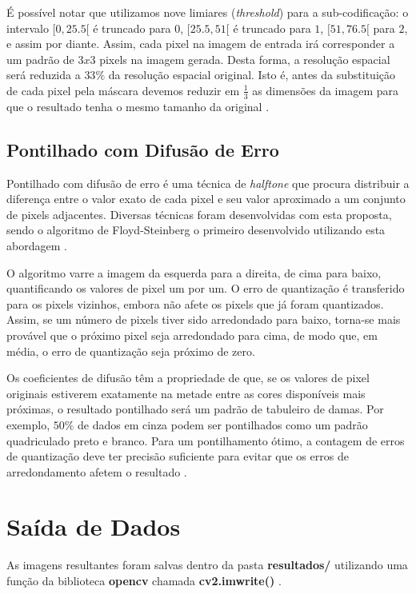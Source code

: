 \documentclass[twoside,twocolumn]{article}
\begin{document}
É possível notar que utilizamos nove limiares (\textit{threshold}) para a sub-codificação: o intervalo $[0,25.5[$ é truncado para $0$, $[25.5,51[$ é truncado para $1$, $[51,76.5[$ para $2$, e assim por diante. Assim, cada pixel na imagem de entrada irá corresponder a um padrão de $3x3$ pixels na imagem gerada. Desta forma, a resolução espacial será reduzida a $33\%$ da resolução espacial original. Isto é, antes da substituição de cada pixel pela máscara devemos reduzir em $\frac{1}{3}$ as dimensões da imagem para que o resultado tenha o mesmo tamanho da original \cite{b4}.

\subsection{Pontilhado com Difusão de Erro}

Pontilhado com difusão de erro é uma técnica de \textit{halftone} que procura distribuir a diferença entre o valor exato de cada pixel e seu valor aproximado a um conjunto de pixels adjacentes. Diversas técnicas foram desenvolvidas com esta proposta, sendo o algoritmo de Floyd-Steinberg o primeiro desenvolvido utilizando esta abordagem \cite{b5}.

O algoritmo varre a imagem da esquerda para a direita, de cima para baixo, quantificando os valores de pixel um por um. O erro de quantização é transferido para os pixels vizinhos, embora não afete os pixels que já foram quantizados. Assim, se um número de pixels tiver sido arredondado para baixo, torna-se mais provável que o próximo pixel seja arredondado para cima, de modo que, em média, o erro de quantização seja próximo de zero.

Os coeficientes de difusão têm a propriedade de que, se os valores de pixel originais estiverem exatamente na metade entre as cores disponíveis mais próximas, o resultado pontilhado será um padrão de tabuleiro de damas. Por exemplo, $50\%$ de dados em cinza podem ser pontilhados como um padrão quadriculado preto e branco. Para um pontilhamento ótimo, a contagem de erros de quantização deve ter precisão suficiente para evitar que os erros de arredondamento afetem o resultado \cite{b6}.


\section{Saída de Dados}

As imagens resultantes foram salvas dentro da pasta \textbf{resultados/} utilizando uma função da biblioteca \textbf{opencv} chamada \textbf{cv2.imwrite()} \cite{b1}.
\end{document}
